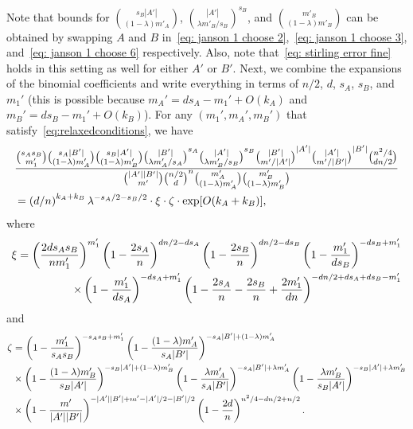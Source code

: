 \documentclass[11pt]{article}
\theoremstyle{plain}
\begin{document}
Note that bounds for $\binom{s_B|A'|}{(1 - \lambda )m'_A}$, $\binom{|A'|}{\lambda m'_B/s_B}^{s_B}$, and $\binom{m'_B}{(1 - \lambda )m'_B}$ can be obtained by swapping $A$ and $B$ in~\eqref{eq: janson 1 choose 2},~\eqref{eq: janson 1 choose 3}, and~\eqref{eq: janson 1 choose 6} respectively. Also, note that~\eqref{eq: stirling error fine} holds in this setting as well for either $A'$ or $B'$.
 Next, we combine the expansions of the binomial coefficients and write everything in terms of $n/2$, $d$, $s_A$, $s_B$, and $m_1'$ (this is possible because $m_A' = ds_A - m_1' + O(k_A)$ and $m_B' = ds_B - m_1' + O(k_B)$). For any $(m_1', m_A', m_B')$ that satisfy~\eqref{eq:relaxedconditions}, we have
 \begin{align}\label{eq: simple main terms}
     &\frac{\binom{s_As_B}{m'_1}\binom{s_A|B'|}{(1 - \lambda )m'_A}\binom{s_B|A'|}{(1 - \lambda )m'_B}\binom{|B'|}{\lambda m'_A/s_A}^{s_A}\binom{|A'|}{\lambda m'_B/s_B}^{s_B}\binom{|B'|}{m'/|A'|}^{|A'|}\binom{|A'|}{m'/|B'|}^{|B'|}\binom{n^2/4}{dn/2}}                {\binom{|A'||B'|}{m'}\binom{n/2}{d}^{n}\binom{m_A'}{(1 - \lambda )m_A'}\binom{m'_B}{(1 - \lambda )m'_B}} \notag \\
     & = \left(d/n\right)^{k_A + k_B}\lambda ^{-s_A/2 - s_B/2}\cdot\xi\cdot\zeta\cdot\exp[O(k_A + k_B)], 
 \end{align}
 where 
 \begin{align}
     \xi = \left(\frac{2ds_As_B}{nm'_1}\right)^{m'_1}\left(1 - \frac{2s_A}{n}\right)^{dn/2 - ds_A}\left(1 - \frac{2s_B}{n}\right)^{dn/2 -ds_B}\left(1 - \frac{m_1'}{ds_B}\right)^{-ds_B + m_1'}\notag\\\times \left(1 - \frac{m_1'}{ds_A} \right)^{-ds_A + m_1'}\left(1 - \frac{2s_A}{n} - \frac{2s_B}{n} + \frac{2m_1'}{dn}\right)^{-dn/2 + ds_A + ds_B -m_1'}\label{eq: Janson 1 xi}
 \end{align}
 and 
 \begin{align}
     \zeta &= \left(1 - \frac{m_1'}{s_As_B}\right)^{-s_As_B + m_1'}
      \left(1 - \frac{(1 - \lambda )m'_A}{s_A|B'|}\right)^{-s_A|B'| + (1 - \lambda )m'_A}\notag \\ &\times\left(1 - \frac{(1 - \lambda )m'_B}{s_B|A'|}\right)^{-s_B|A'| + (1 - \lambda )m'_B} \left(1 - \frac{\lambda  m'_A}{s_A|B'|}\right)^{-s_A|B'| + \lambda m'_A}
      \left(1 - \frac{\lambda m'_B}{s_B|A'|}\right)^{-s_B|A'| + \lambda m'_B}\notag \\ &\times\left(1 - \frac{m'}{|A'||B'|}\right)^{-|A'||B'| + m' - |A'|/2 - |B'|/2}\left(1 - \frac{2d}{n}\right)^{n^2/4 - dn/2 + n/2}.\label{eq: Janson 1 zeta}
 \end{align}
\end{document}
